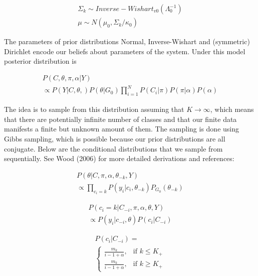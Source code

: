 \documentclass[a4paper]{article}
\begin{document}
 \begin{equation}
 \begin{aligned}
 \Sigma_{k} \sim Inverse-Wishart_{v0}(\Lambda^{-1}_0) \\
 \mu \sim N(\mu_0, \Sigma_{k}/\kappa_0)
 \end{aligned}
 \end{equation}
 
 The parameters of prior distributions Normal, Inverse-Wishart and (symmetric) Dirichlet encode our beliefs about parameters of the system. Under this model posterior distribution is
 
  \begin{equation}
  \begin{aligned}
  P(C, \theta, \pi, \alpha | Y) \\
  \propto P(Y | C, \theta,) P(\theta | G_0) \prod_{i=1}^{N} P(C_i | \pi) P(\pi | \alpha) P(\alpha)
  \end{aligned}
  \end{equation}
  
  The idea is to sample from this distribution assuming that $K \rightarrow \infty$, which means that there are potentially infinite number of classes and that our finite data manifests a finite but unknown amount of them. The sampling is done using Gibbs sampling, which is possible because our prior distributions are all conjugate. Below are the conditional distributions that we sample from sequentially. See Wood (2006) for more detailed derivations and references:
  
 \begin{equation}
 \begin{aligned}
 P(\theta | C, \pi, \alpha, \theta_{-k}, Y) \\
 \propto  \prod_{c_i=k} P(y_i | c_i, \theta_{-k}) P_{G_0}(\theta_{-k})
 \end{aligned}
 \label{gauss_theta}
 \end{equation} 
 
 \begin{equation}
 \begin{aligned}
 P(c_i = k | C_{-i}, \pi, \alpha, \theta, Y) \\
 \propto P(y_i | c_{-i}, \theta) P(c_i | C_{-i})
 \end{aligned}
 \label{c_equals_k}
 \end{equation} 
 
  \begin{equation}
  \begin{aligned}
  P(c_i | C_{-i}) =\\
	  \begin{cases}
	  \frac{m_k}{i-1+\alpha}, & \text{if } k \leq K_{+} \\
	  \frac{m_k}{i-1+\alpha}, & \text{if } k \geq K_{+}
	  \end{cases}
	  \label{crp}
  \end{aligned}
  \end{equation} 
  
\end{document}
